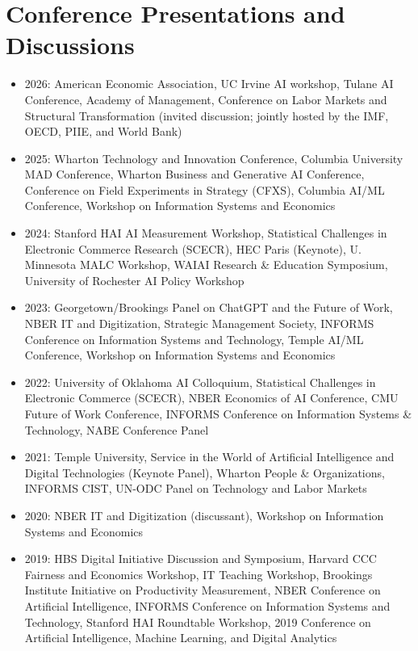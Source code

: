 \documentclass[10pt,letterpaper]{article}
\begin{document}
\section*{Conference Presentations and Discussions}

\begin{itemize}
\item 2026: American Economic Association, UC Irvine AI workshop, Tulane AI Conference, Academy of Management, Conference on Labor Markets and Structural Transformation (invited discussion; jointly hosted by the IMF, OECD, PIIE, and World Bank)
\item 2025: Wharton Technology and Innovation Conference, Columbia University MAD Conference, Wharton Business and Generative AI Conference, Conference on Field Experiments in Strategy (CFXS), Columbia AI/ML Conference, Workshop on Information Systems and Economics
\item 2024: Stanford HAI AI Measurement Workshop, Statistical Challenges in Electronic Commerce Research (SCECR), HEC Paris (Keynote), U. Minnesota MALC Workshop, WAIAI Research \& Education Symposium, University of Rochester AI Policy Workshop
\item 2023: Georgetown/Brookings Panel on ChatGPT and the Future of Work, NBER IT and Digitization, Strategic Management Society, INFORMS Conference on Information Systems and Technology, Temple AI/ML Conference, Workshop on Information Systems and Economics
\item 2022: University of Oklahoma AI Colloquium, Statistical Challenges in Electronic Commerce (SCECR), NBER Economics of AI Conference, CMU Future of Work Conference, INFORMS Conference on Information Systems \& Technology, NABE Conference Panel
\item 2021: Temple University, Service in the World of Artificial Intelligence and Digital Technologies (Keynote Panel), Wharton People \& Organizations, INFORMS CIST, UN-ODC Panel on Technology and Labor Markets
\item 2020: NBER IT and Digitization (discussant), Workshop on Information Systems and Economics
\item 2019: HBS Digital Initiative Discussion and Symposium, Harvard CCC
  Fairness and Economics Workshop, IT Teaching Workshop, Brookings Institute
  Initiative on Productivity Measurement, NBER Conference on
  Artificial Intelligence, INFORMS Conference on Information Systems
  and Technology, Stanford HAI Roundtable Workshop, 2019 Conference on
  Artificial Intelligence, Machine Learning, and Digital Analytics

\end{itemize}
\end{document}
